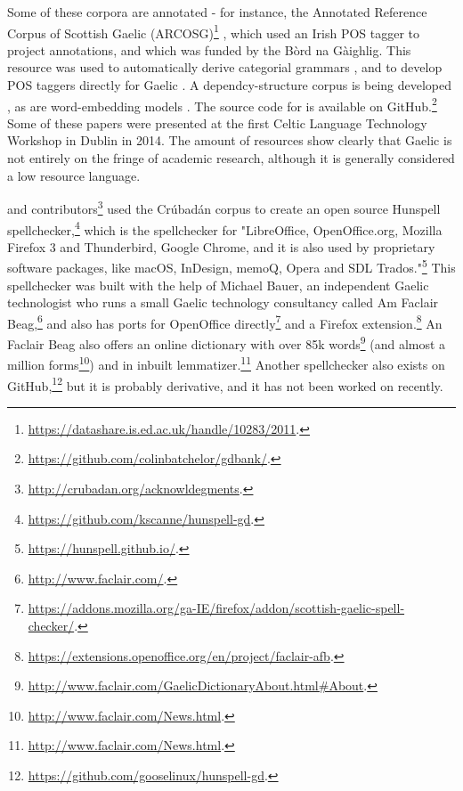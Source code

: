 Some of these corpora are annotated - for instance, the Annotated Reference Corpus of Scottish Gaelic (ARCOSG)\footnote{\href{https://datashare.is.ed.ac.uk/handle/10283/2011}{https://datashare.is.ed.ac.uk/handle/10283/2011}. } \citep{ARCOSG2016, lamb2014scottish}, which used an Irish POS tagger \citep{ui2006part} to project annotations, and which was funded by the B\`ord na G\`aighlig. This resource was used to automatically derive categorial grammars \citep{batchelor2016automatic}, and to develop POS taggers directly for Gaelic \citep{lamb2014developing}. A dependcy-structure corpus is being developed \citep{batchelor2014gdbank}, as are word-embedding models \citep{lamb2016developing}. The source code for \citet{batchelor2014gdbank, batchelor2016automatic} is available on GitHub.\footnote{\href{https://github.com/colinbatchelor/gdbank/}{https://github.com/colinbatchelor/gdbank/}. } Some of these papers were presented at the first Celtic Language Technology Workshop in Dublin in 2014. The amount of resources show clearly that Gaelic is not entirely on the fringe of academic research, although it is generally considered a low resource language.

\citet{scannell2007crubadan} and contributors\footnote{\href{http://crubadan.org/acknowldegments}{http://crubadan.org/acknowldegments}. } used the Cr\'ubad\'an corpus to create an open source Hunspell spellchecker,\footnote{\href{https://github.com/kscanne/hunspell-gd}{https://github.com/kscanne/hunspell-gd}. } which is the spellchecker for "LibreOffice, OpenOffice.org, Mozilla Firefox 3 and Thunderbird, Google Chrome, and it is also used by proprietary software packages, like macOS, InDesign, memoQ, Opera and SDL Trados."\footnote{\href{https://hunspell.github.io/}{https://hunspell.github.io/}. } This spellchecker was built with the help of Michael Bauer, an independent Gaelic technologist who runs a small Gaelic technology consultancy called Am Faclair Beag,\footnote{\href{http://www.faclair.com/}{http://www.faclair.com/}. } and also has ports for OpenOffice directly\footnote{\href{https://addons.mozilla.org/ga-IE/firefox/addon/scottish-gaelic-spell-checker/}{https://addons.mozilla.org/ga-IE/firefox/addon/scottish-gaelic-spell-checker/}. } and a Firefox extension.\footnote{\href{https://extensions.openoffice.org/en/project/faclair-afb}{https://extensions.openoffice.org/en/project/faclair-afb}. } An Faclair Beag also offers an online dictionary with over 85k words\footnote{\href{http://www.faclair.com/GaelicDictionaryAbout.html\#About}{http://www.faclair.com/GaelicDictionaryAbout.html\#About}. }
 (and almost a million forms\footnote{\href{http://www.faclair.com/News.html}{http://www.faclair.com/News.html}. }) and in inbuilt lemmatizer.\footnote{\href{http://www.faclair.com/News.html}{http://www.faclair.com/News.html}. } Another spellchecker also exists on GitHub,\footnote{\href{https://github.com/gooselinux/hunspell-gd}{https://github.com/gooselinux/hunspell-gd}. } but it is probably derivative, and it has not been worked on recently.

